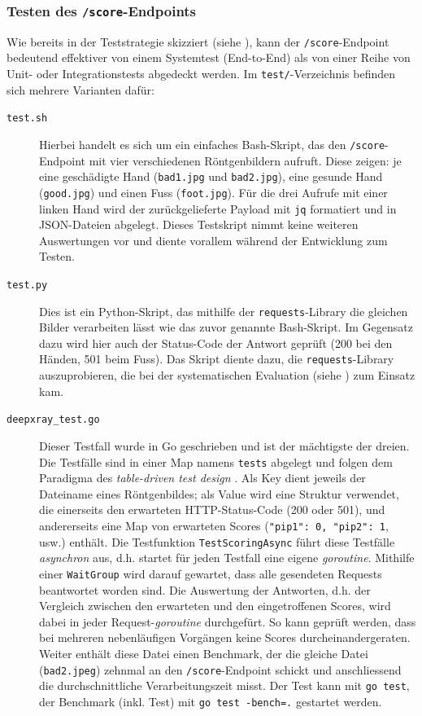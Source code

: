 \subsubsection{Testen des \texttt{/score}-Endpoints}

Wie bereits in der Teststrategie skizziert (siehe ), kann der \texttt{/score}-Endpoint bedeutend effektiver von einem Systemtest (End-to-End) als von einer Reihe von Unit- oder Integrationstests abgedeckt werden. Im \texttt{test/}-Verzeichnis befinden sich mehrere Varianten dafür:

\begin{description}
    \item[\texttt{test.sh}] Hierbei handelt es sich um ein einfaches Bash-Skript, das den \texttt{/score}-Endpoint mit vier verschiedenen Röntgenbildern aufruft. Diese zeigen: je eine geschädigte Hand (\texttt{bad1.jpg} und \texttt{bad2.jpg}), eine gesunde Hand (\texttt{good.jpg}) und einen Fuss (\texttt{foot\-.jpg}). Für die drei Aufrufe mit einer linken Hand wird der zurückgelieferte Payload mit \texttt{jq} formatiert und in JSON-Dateien abgelegt. Dieses Testskript nimmt keine weiteren Auswertungen vor und diente vorallem während der Entwicklung zum Testen.
    \item[\texttt{test.py}] Dies ist ein Python-Skript, das mithilfe der \texttt{requests}-Library die gleichen Bilder verarbeiten lässt wie das zuvor genannte Bash-Skript. Im Gegensatz dazu wird hier auch der Status-Code der Antwort geprüft (200 bei den Händen, 501 beim Fuss). Das Skript diente dazu, die \texttt{requests}-Library auszuprobieren, die bei der systematischen Evaluation (siehe ) zum Einsatz kam.
    \item[\texttt{deepxray\_test.go}] Dieser Testfall wurde in Go geschrieben und ist der mächtigste der dreien. Die Testfälle sind in einer Map namens \texttt{tests} abgelegt und folgen dem Paradigma des \textit{table-driven test design} \cite[S. 306]{gopl}. Als Key dient jeweils der Dateiname eines Röntgenbildes; als Value wird eine Struktur verwendet, die einerseits den erwarteten HTTP-Status-Code (200 oder 501), und andererseits eine Map von erwarteten Scores (\texttt{"pip1": 0, "pip2": 1}, usw.) enthält. Die Testfunktion \texttt{TestScoringAsync} führt diese Testfälle \textit{asynchron} aus, d.h. startet für jeden Testfall eine eigene \textit{goroutine}. Mithilfe einer \texttt{WaitGroup} \cite[S. 238]{gopl} wird darauf gewartet, dass alle gesendeten Requests beantwortet worden sind. Die Auswertung der Antworten, d.h. der Vergleich zwischen den erwarteten und den eingetroffenen Scores, wird dabei in jeder Request-\textit{goroutine} durchgefürt. So kann geprüft werden, dass bei mehreren nebenläufigen Vorgängen keine Scores durcheinandergeraten. Weiter enthält diese Datei einen Benchmark, der die gleiche Datei (\texttt{bad2.jpeg}) zehnmal an den \texttt{/score}-Endpoint schickt und anschliessend die durchschnittliche Verarbeitungszeit misst. Der Test kann mit \texttt{go test}, der Benchmark (inkl. Test) mit \texttt{go test -bench=.} gestartet werden.
\end{description}


